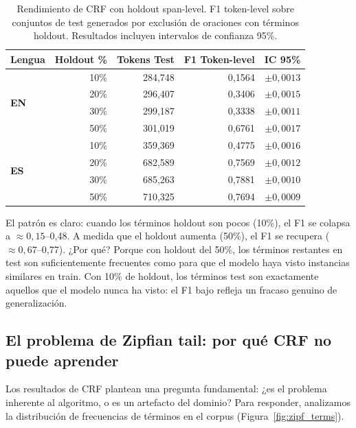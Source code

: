 \begin{table}[H]
\centering
\small
\caption{Rendimiento de CRF con holdout span-level. F1 token-level sobre conjuntos de test generados por exclusión de oraciones con términos holdout. Resultados incluyen intervalos de confianza 95\%.}
\label{tab:crf_holdout_results}
\begin{tabular}{@{} l r r r r @{}}
\toprule
\textbf{Lengua} & \textbf{Holdout \%} & \textbf{Tokens Test} & \textbf{F1 Token-level} & \textbf{IC 95\%} \\
\midrule
\multirow{4}{*}{\textbf{EN}} & 10\% & 284{,}748 & 0{,}1564 & $\pm 0{,}0013$ \\
 & 20\% & 296{,}407 & 0{,}3406 & $\pm 0{,}0015$ \\
 & 30\% & 299{,}187 & 0{,}3338 & $\pm 0{,}0011$ \\
 & 50\% & 301{,}019 & 0{,}6761 & $\pm 0{,}0017$ \\
\midrule
\multirow{4}{*}{\textbf{ES}} & 10\% & 359{,}369 & 0{,}4775 & $\pm 0{,}0016$ \\
 & 20\% & 682{,}589 & 0{,}7569 & $\pm 0{,}0012$ \\
 & 30\% & 685{,}263 & 0{,}7881 & $\pm 0{,}0010$ \\
 & 50\% & 710{,}325 & 0{,}7694 & $\pm 0{,}0009$ \\
\bottomrule
\end{tabular}
\end{table}

El patrón es claro: cuando los términos holdout son pocos (10\%), el F1 se colapsa a $\approx 0{,}15$--0{,}48. A medida que el holdout aumenta (50\%), el F1 se recupera ($\approx 0{,}67$--0{,}77). ¿Por qué? Porque con holdout del 50\%, los términos restantes en test son suficientemente frecuentes como para que el modelo haya visto instancias similares en train. Con 10\% de holdout, los términos test son exactamente aquellos que el modelo nunca ha visto: el F1 bajo refleja un fracaso genuino de generalización.

\subsection{El problema de Zipfian tail: por qué CRF no puede aprender}
\label{subsec:zipfian_tail}

Los resultados de CRF plantean una pregunta fundamental: ¿es el problema inherente al algoritmo, o es un artefacto del dominio? Para responder, analizamos la distribución de frecuencias de términos en el corpus (Figura~\ref{fig:zipf_terms}).

